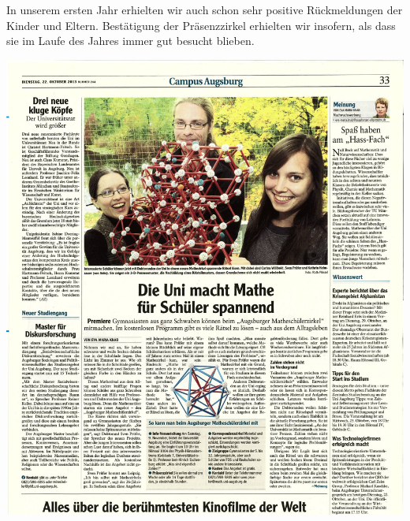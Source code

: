 \documentclass[12pt]{zettel}
\begin{document}
In unserem ersten Jahr erhielten wir auch schon sehr positive Rückmeldungen der
Kinder und Eltern. Bestätigung der Präsenzzirkel erhielten wir insofern, als
dass sie im Laufe des Jahres immer gut besucht blieben.



\hspace{-3.5cm}\includegraphics[scale=0.62]{Augsburger-Allgemeine-2013-10-22.jpeg}


\end{document}
